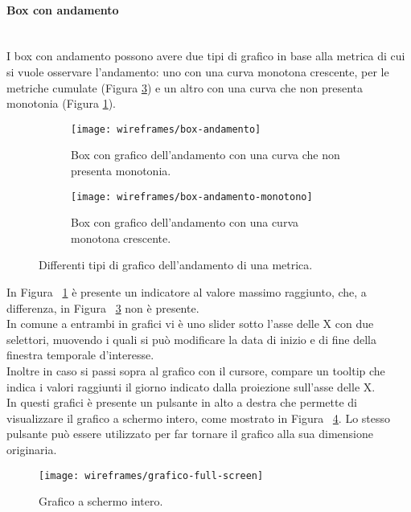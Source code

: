 \documentclass[../../../main.tex]{subfiles}
\begin{document}
\paragraph{Box con andamento}\mbox{}\\
I box con andamento possono avere due tipi di grafico in base alla metrica di cui si vuole osservare l'andamento: uno con una curva monotona crescente, per le metriche cumulate (Figura \ref{fig:box-andamento-monotono}) e un altro con una curva che non presenta monotonia (Figura \ref{fig:box-andamento-no-monotonia}). 
\begin{figure}[H]
    \begin{subfigure}[b]{0.5\textwidth}
        \centering
        \texttt{[image: wireframes/box-andamento]}
        \caption{Box con grafico dell'andamento con una curva che non presenta monotonia.}\label{fig:box-andamento-no-monotonia}
    \end{subfigure}
\hfill
    \begin{subfigure}[b]{0.5\textwidth}
        \centering
        \texttt{[image: wireframes/box-andamento-monotono]}
        \caption{Box con grafico dell'andamento con una curva monotona crescente.}
        \label{fig:box-andamento-monotono}
    \end{subfigure}
    \caption{Differenti tipi di grafico dell'andamento di una metrica.}
\end{figure}

In Figura ~\ref{fig:box-andamento-no-monotonia} è presente un indicatore al valore massimo raggiunto, che, a differenza, in Figura ~\ref{fig:box-andamento-monotono} non è presente.\\
In comune a entrambi in grafici vi è uno slider sotto l'asse delle X con due selettori, muovendo i quali si può modificare la data di inizio e di fine della finestra temporale d'interesse.\\
Inoltre in caso si passi sopra al grafico con il cursore, compare un tooltip che indica i valori raggiunti il giorno indicato dalla proiezione sull'asse delle X.\\
In questi grafici è presente un pulsante in alto a destra che permette di visualizzare il grafico a schermo intero, come mostrato in Figura ~\ref{fig:grafico-full-screen}. Lo stesso pulsante può essere utilizzato per far tornare il grafico alla sua dimensione originaria.
\begin{figure}[H]
    \centering
    \texttt{[image: wireframes/grafico-full-screen]}
    \caption{Grafico a schermo intero.}
    \label{fig:grafico-full-screen}
\end{figure}
\end{document}
